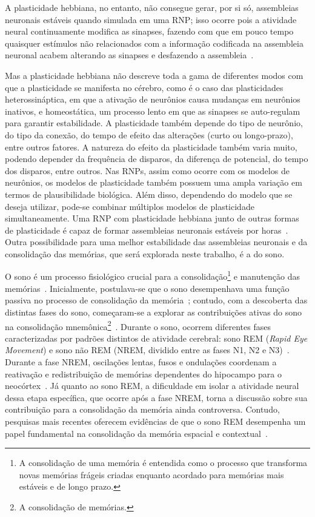 A plasticidade hebbiana, no entanto, não consegue gerar, por si só, assembleias neuronais estáveis quando simulada em uma RNP;\@
isso ocorre pois a atividade neural continuamente modifica as sinapses, fazendo com que em pouco tempo quaisquer estímulos não
relacionados com a informação codificada na assembleia neuronal acabem alterando as sinapses e desfazendo a
assembleia~\cite{gerstnerSpiking2002}.

Mas a plasticidade hebbiana não descreve toda a gama de diferentes modos com que a plasticidade se manifesta no cérebro, como é o
caso das  plasticidades heterossináptica, em que a ativação de neurônios causa mudanças em neurônios inativos, e homeostática, um
processo lento em que as sinapses se auto-regulam para garantir estabilidade. A plasticidade também depende do tipo de neurônio,
do tipo da conexão, do tempo de efeito das alterações (curto ou longo-prazo), entre outros fatores. A natureza do efeito da
plasticidade também varia muito, podendo depender da frequência de disparos, da diferença de potencial, do tempo dos disparos,
entre outros. Nas RNPs, assim como ocorre com os modelos de neurônios, os modelos de plasticidade também possuem uma ampla
variação em termos de plausibilidade biológica. Além disso, dependendo do modelo que se deseja utilizar, pode-se combinar
múltiplos modelos de plasticidade simultaneamente. Uma RNP com plasticidade hebbiana junto de outras formas de plasticidade é
capaz de formar assembleias neuronais estáveis por horas~\cite{zenkeDiverse2015}. Outra possibilidade para uma melhor estabilidade
das assembleias neuronais e da consolidação das memórias, que será explorada neste trabalho, é a do sono.

O sono é um processo fisiológico crucial para a consolidação\footnote{A consolidação de uma memória é entendida como o processo
que transforma novas memórias frágeis criadas enquanto acordado para memórias mais estáveis e de longo prazo.} e manutenção das
memórias~\cite{blissittSleep2001, walkerSleep2006, diekelmannMemory2010}. Inicialmente, postulava-se que o sono desempenhava uma
função passiva no processo de consolidação da memória~\cite{jenkinsObliviscence1924}; contudo, com a descoberta das distintas
fases do sono, começaram-se a explorar as contribuições ativas do sono na consolidação mnemônica\footnote{A consolidação de
memórias.}~\cite{aserinskyRegularly1953}. Durante o sono, ocorrem diferentes fases caracterizadas por padrões distintos de
atividade cerebral: sono REM (\textit{Rapid Eye Movement}) e sono não REM (NREM, dividido entre as fases N1, N2 e
N3)~\cite{schulzRethinking2008}. Durante a fase NREM, oscilações lentas, fusos e ondulações coordenam a reativação e
redistribuição de memórias dependentes do hipocampo para o neocórtex~\cite{diekelmannMemory2010}. Já quanto ao sono REM, a
dificuldade em isolar a atividade neural dessa etapa específica, que ocorre após a fase NREM, torna a discussão sobre sua
contribuição para a consolidação da memória ainda controversa. Contudo, pesquisas mais recentes oferecem evidências de que o sono
REM desempenha um papel fundamental na consolidação da memória espacial e contextual~\cite{boyceREM2017}.

